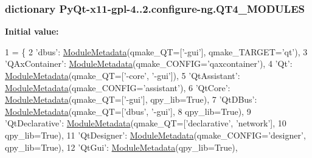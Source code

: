 \subsubsection[{Q\+T4\+\_\+\+M\+O\+D\+U\+L\+E\+S}]{\setlength{\rightskip}{0pt plus 5cm}dictionary Py\+Qt-\/x11-\/gpl-\/4..\+2.configure-\/ng.\+Q\+T4\+\_\+\+M\+O\+D\+U\+L\+E\+S}\label{namespacePyQt-x11-gpl-4_811_82_1_1configure-ng_a70e04ef5d5c5da6f18086a217994435c}
{\bfseries Initial value\+:}
\begin{DoxyCode}
1 = \{
2     \textcolor{stringliteral}{'dbus'}:             \hyperlink{classPyQt-x11-gpl-4_811_82_1_1configure-ng_1_1ModuleMetadata}{ModuleMetadata}(qmake\_QT=[\textcolor{stringliteral}{'-gui'}], qmake\_TARGET=\textcolor{stringliteral}{'qt'}),
3     \textcolor{stringliteral}{'QAxContainer'}:     \hyperlink{classPyQt-x11-gpl-4_811_82_1_1configure-ng_1_1ModuleMetadata}{ModuleMetadata}(qmake\_CONFIG=\textcolor{stringliteral}{'qaxcontainer'}),
4     \textcolor{stringliteral}{'Qt'}:               \hyperlink{classPyQt-x11-gpl-4_811_82_1_1configure-ng_1_1ModuleMetadata}{ModuleMetadata}(qmake\_QT=[\textcolor{stringliteral}{'-core'}, \textcolor{stringliteral}{'-gui'}]),
5     \textcolor{stringliteral}{'QtAssistant'}:      \hyperlink{classPyQt-x11-gpl-4_811_82_1_1configure-ng_1_1ModuleMetadata}{ModuleMetadata}(qmake\_CONFIG=\textcolor{stringliteral}{'assistant'}),
6     \textcolor{stringliteral}{'QtCore'}:           \hyperlink{classPyQt-x11-gpl-4_811_82_1_1configure-ng_1_1ModuleMetadata}{ModuleMetadata}(qmake\_QT=[\textcolor{stringliteral}{'-gui'}], qpy\_lib=\textcolor{keyword}{True}),
7     \textcolor{stringliteral}{'QtDBus'}:           \hyperlink{classPyQt-x11-gpl-4_811_82_1_1configure-ng_1_1ModuleMetadata}{ModuleMetadata}(qmake\_QT=[\textcolor{stringliteral}{'dbus'}, \textcolor{stringliteral}{'-gui'}],
8                                 qpy\_lib=\textcolor{keyword}{True}),
9     \textcolor{stringliteral}{'QtDeclarative'}:    \hyperlink{classPyQt-x11-gpl-4_811_82_1_1configure-ng_1_1ModuleMetadata}{ModuleMetadata}(qmake\_QT=[\textcolor{stringliteral}{'declarative'}, \textcolor{stringliteral}{'network'}],
10                                 qpy\_lib=\textcolor{keyword}{True}),
11     \textcolor{stringliteral}{'QtDesigner'}:       \hyperlink{classPyQt-x11-gpl-4_811_82_1_1configure-ng_1_1ModuleMetadata}{ModuleMetadata}(qmake\_CONFIG=\textcolor{stringliteral}{'designer'}, qpy\_lib=\textcolor{keyword}{True}),
12     \textcolor{stringliteral}{'QtGui'}:            \hyperlink{classPyQt-x11-gpl-4_811_82_1_1configure-ng_1_1ModuleMetadata}{ModuleMetadata}(qpy\_lib=\textcolor{keyword}{True}),

\end{DoxyCode}
